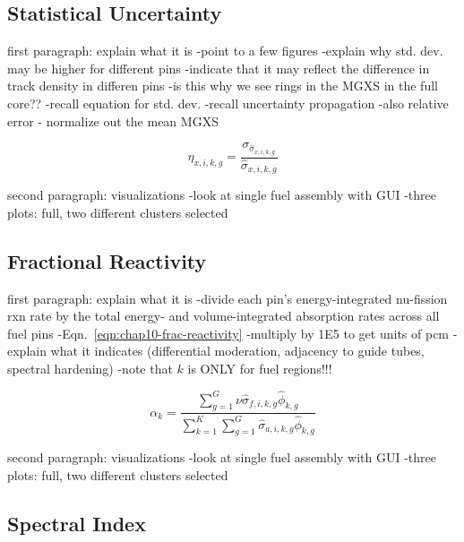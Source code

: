 \subsection{Statistical Uncertainty}
\label{subsec:chap10-stat-uncertainty}

first paragraph: explain what it is
-point to a few figures
-explain why std. dev. may be higher for different pins
-indicate that it may reflect the difference in track density in differen pins
  -is this why we see rings in the \ac{MGXS} in the full core??
-recall equation for std. dev.
-recall uncertainty propagation
-also relative error - normalize out the mean \ac{MGXS}

\begin{equation}
\label{eqn:chap10-rel-err}
\eta_{x,i,k,g} = \frac{\sigma_{\hat{\sigma}_{x,i,k,g}}}{\hat{\sigma}_{x,i,k,g}}
\end{equation}

second paragraph: visualizations
-look at single fuel assembly with GUI
-three plots: full, two different clusters selected

\subsection{Fractional Reactivity}
\label{subsec:chap10-frac-reactivity}

first paragraph: explain what it is
-divide each pin's energy-integrated nu-fission rxn rate by the total energy- and volume-integrated absorption rates across all fuel pins
-Eqn.~\ref{eqn:chap10-frac-reactivity}
  -multiply by 1E5 to get units of \ac{pcm}
-explain what it indicates (differential moderation, adjacency to guide tubes, spectral hardening)
-note that $k$ is ONLY for fuel regions!!!

\begin{equation}
\label{eqn:chap10-frac-reactivity}
\alpha_{k} = \frac{\displaystyle\sum\limits_{g=1}^{G}\nu\hat{\sigma}_{f,i,k,g}\hat{\phi}_{k,g}}{\displaystyle\sum\limits_{k=1}^{K}\displaystyle\sum\limits_{g=1}^{G}\hat{\sigma}_{a,i,k,g}\hat{\phi}_{k,g}}
\end{equation}

second paragraph: visualizations
-look at single fuel assembly with GUI
-three plots: full, two different clusters selected

\subsection{Spectral Index}
\label{subsec:chap10-spec-index}

